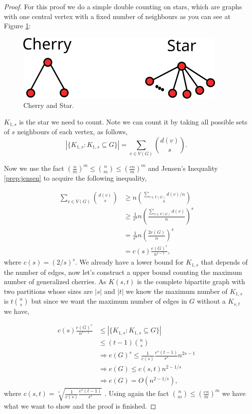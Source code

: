 \documentclass[12pt,twoside,a4paper,bibliography=totocnumbered]{book}
\numberwithin{equation}{section}
\theoremstyle{remark}
\begin{document}
\begin{proof}

For this proof we do a simple double counting on stars, which are graphs with one central vertex with a fixed number of neighbours as you can see at Figure \ref{fig:generalizedcherry}:

\begin{figure}[!htb]
     \centering
     \includegraphics[scale=1]{Figuras/cherry-and-star.png}
     \caption{Cherry and Star.}
     \label{fig:generalizedcherry}
\end{figure}

$K_{1,s}$ is the star we need to count. Note we can count it by taking all possible sets of $s$ neighbours of each vertex, as follows,
$$ |\{K_{1,s}\colon K_{1,s} \subseteq G\}| = \sum_{v \in V(G)} \binom{d(v)}{s} .$$

Now we use the fact $\left(\frac{n}{m}\right)^m \leq \binom{n}{m} \leq \left(\frac{en}{m}\right)^m$ and Jensen's Inequality \ref{prep:jensen} to acquire the following inequality,

\begin{align*} 
\sum_{v \in V(G)} \binom{d(v)}{s} & \geq n\binom{\sum_{v \in V(G)} d(v)/n}{s}\\ 
& \geq \frac{1}{s^s} n \left( \frac{\sum_{v \in V(G)} d(v)}{n} \right) ^s \\
& = \frac{1}{s^s} n \left( \frac{ 2 e(G)}{n} \right) ^s \\
& = c(s) \frac{e(G)^s}{n^{s-1}},
\end{align*}
where $c(s) = \left(2/s\right)^s$.
We already have a lower bound for $K_{1,s}$ that depends of the number of edges, now let's construct a upper bound counting the maximum number of generalized cherries.
As $K(s,t)$ is the complete bipartite graph with two partitions whose sizes are $|s|$ and $|t|$ we know the maximum number of $K_{1,s}$ is $t\binom{n}{s}$ but since we want the maximum number of edges in $G$ without a $K_{s,t}$ we have,

\begin{align*}
c(s) \frac{e(G)^s}{n^{s-1}} &\leq |\{K_{1,s}\colon K_{1,s} \subseteq G\}|\\
&\leq (t-1) \binom{n}{s}\\
		       & \Rightarrow e(G)^s \leq \frac{1}{c(s)}\frac{e^s(t-1)}{s^s}n^{2s-1}\\
		       &\Rightarrow e(G) \leq c(s,t) n^{2-1/s}\\
		       &\Rightarrow e(G) = O(n^{2-1/s}),
\end{align*}
where $c(s,t)= \sqrt[s]{\frac{1}{c(s)}\frac{e^s(t-1)}{s^s}}$ . Using again the fact $\binom{n}{m} \leq \left(\frac{en}{m}\right)^m$ we have what we want to show and the proof is finished.
\end{proof}
\end{document}
